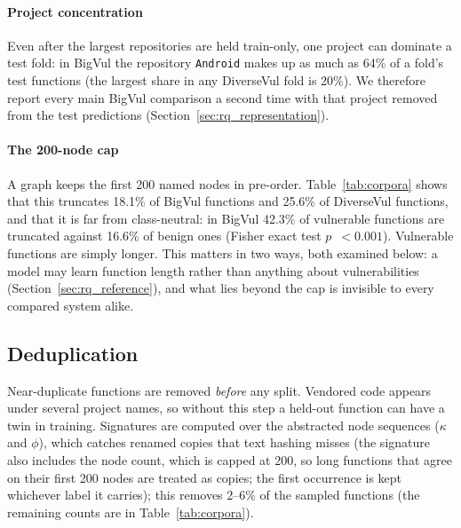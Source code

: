 \documentclass[pdflatex,sn-basic]{sn-jnl}
\theoremstyle{thmstyleone}%
\newcommand{\numbigvulTopTestProject}{Android}
\newcommand{\numbigvulTopTestShareMax}{64}
\newcommand{\numbigvulTruncBenignPct}{16.6}
\newcommand{\numbigvulTruncP}{$<0.001$}
\newcommand{\numbigvulTruncPct}{18.1}
\newcommand{\numbigvulTruncVulnPct}{42.3}
\newcommand{\numdiversevulTopTestShareMax}{20}
\newcommand{\numdiversevulTruncPct}{25.6}
\begin{document}
\paragraph{Project concentration} Even after the largest repositories are held
train-only, one project can dominate a test fold: in BigVul the repository
\texttt{\numbigvulTopTestProject} makes up as much as
\numbigvulTopTestShareMax\% of a fold's test functions (the largest share in any
DiverseVul fold is \numdiversevulTopTestShareMax\%). We therefore report every
main BigVul comparison a second time with that project removed from the test
predictions (Section~\ref{sec:rq_representation}).

\paragraph{The 200-node cap} A graph keeps the first 200 named nodes in
pre-order. Table~\ref{tab:corpora} shows that this truncates
\numbigvulTruncPct\% of BigVul functions and \numdiversevulTruncPct\% of
DiverseVul functions, and that it is far from class-neutral: in BigVul
\numbigvulTruncVulnPct\% of vulnerable functions are truncated against
\numbigvulTruncBenignPct\% of benign ones (Fisher exact test
$p$~\numbigvulTruncP). Vulnerable functions are simply longer. This matters in
two ways, both examined below: a model may learn function length rather than
anything about vulnerabilities (Section~\ref{sec:rq_reference}), and what lies
beyond the cap is invisible to every compared system alike.

\subsection{Deduplication}
\label{sec:dedup}
Near-duplicate functions are removed \emph{before} any split. Vendored code
appears under several project names, so without this step a held-out function
can have a twin in training. Signatures are computed over the abstracted node
sequences ($\kappa$ and $\phi$), which catches renamed copies that text hashing
misses (the signature also includes the node count, which is capped at 200,
so long functions that agree on their first 200 nodes are treated as copies;
the first occurrence is kept whichever label it carries); this removes 2--6\% of the sampled functions (the remaining counts are
in Table~\ref{tab:corpora}).
\end{document}
